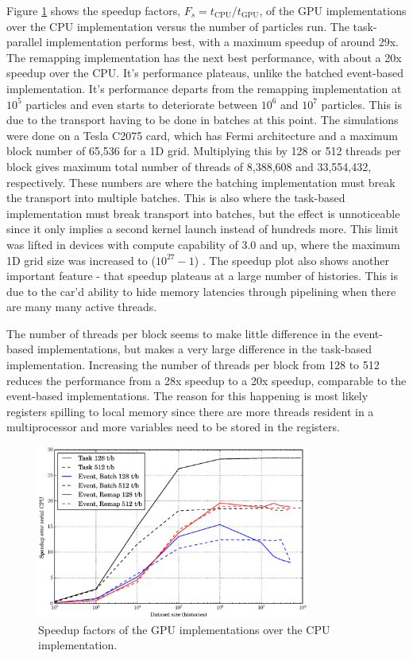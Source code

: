 Figure \ref{prelim_speedup} shows the speedup factors, $F_s=t_\mathrm{CPU}/t_\mathrm{GPU}$, of the GPU implementations over the CPU implementation versus the number of particles run.  The task-parallel implementation performs best, with a maximum speedup of around 29x.  The remapping implementation has the next best performance, with about a 20x speedup over the CPU.  It's performance plateaus, unlike the batched event-based implementation.  It's performance departs from the remapping implementation at $10^5$ particles and even starts to deteriorate between $10^6$ and $10^7$ particles.  This is due to the transport having to be done in batches at this point.  The simulations were done on a Tesla C2075 card, which has Fermi architecture and a maximum block number of 65,536 for a 1D grid.  Multiplying this by 128 or 512 threads per block gives maximum total number of threads of 8,388,608 and 33,554,432, respectively.  These numbers are where the batching implementation must break the transport into multiple batches.  This is also where the task-based implementation must break transport into batches, but the effect is unnoticeable since it only implies a second kernel launch instead of hundreds more.  This limit was lifted in devices with compute capability of 3.0 and up, where the maximum 1D grid size was increased to ($10^{27}-1$) \cite{cuda}.  The speedup plot also shows another important feature - that speedup plateaus at a large number of histories.  This is due to the car'd ability to hide memory latencies through pipelining when there are many many active threads.  

The number of threads per block seems to make little difference in the event-based implementations, but makes a very large difference in the task-based implementation.  Increasing the number of threads per block from 128 to 512 reduces the performance from a 28x speedup to a 20x speedup, comparable to the event-based implementations.  The reason for this happening is most likely registers spilling to local memory since there are more threads resident in a multiprocessor and more variables need to be stored in the registers.

\begin{figure}[h!] 
  \centering
    \includegraphics[width=0.8\textwidth]{graphics/prelim_speedup.eps}
     \caption{Speedup factors of the GPU implementations over the CPU implementation. \label{prelim_speedup} }
\end{figure}

